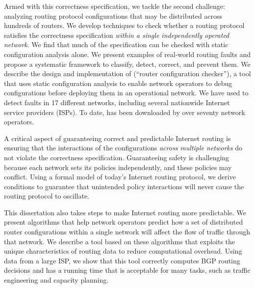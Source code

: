 Armed with this correctness specification, we tackle the second
challenge: analyzing routing protocol configurations that may
be distributed across hundreds of routers.  We develop
techniques to check whether a
routing protocol satisfies the correctness specification 
{\em within a single independently operated network}.  
We find that much of the specification can be checked with static
configuration analysis alone.  We present examples of real-world routing
faults and propose a systematic framework to classify, detect, correct,
and prevent them.  We describe the design and implementation of
\rcc (``router configuration checker''), a tool that uses static
configuration analysis to enable network operators to debug
configurations before deploying them in an operational network.  We have
used \rcc to detect faults in 17 different networks, including several
nationwide Internet service providers (ISPs).  To date, \rcc has been
downloaded by over seventy network operators.  

A critical aspect of guaranteeing correct and predictable Internet
routing is ensuring that the interactions of the configurations {\em
across multiple networks} do not violate the correctness specification.
Guaranteeing safety is challenging because each network sets its policies
independently, and these policies may conflict.  Using a formal model of
today's Internet routing protocol, we derive conditions to guarantee
that unintended policy interactions will never cause the routing
protocol to oscillate.

This dissertation also takes steps to make Internet routing more
predictable. We present algorithms that help network operators predict
how a set of distributed router configurations within a single network
will affect the flow of traffic through that network.  We describe a tool
based on these algorithms that exploits the unique
characteristics of routing data to reduce computational overhead.  Using
data from a large ISP, we show that this tool correctly computes BGP
routing decisions and has a running time that is acceptable for many
tasks, such as traffic engineering and capacity planning.



